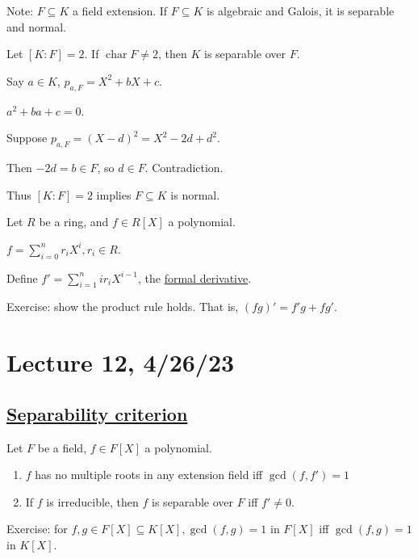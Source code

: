 \documentclass[x11names,reqno,14pt]{extarticle}
\DeclareMathOperator{\Char}{char}
\begin{document}
Note: $F\subseteq K$ a field extension. If $F \subseteq K$ is algebraic and Galois, it is separable and normal. 

\exm

Let $[K:F] = 2$. If $\Char F \neq 2$, then $K$ is separable over $F$. 

Say $a \in K$, $p_{a, F} = X^2 + bX + c$. 

$a^2 + ba + c = 0$. 

Suppose $p_{a, F} = (X - d)^2 = X^2 - 2d + d^2$. 

Then $-2d = b \in F$, so $d \in F$. Contradiction.

Thus $[K:F] = 2$ implies $F \subseteq K$ is normal. 


Let $R$ be a ring, and $f \in R[X]$ a polynomial. 

$f = \sum_{i=0}^nr_iX^i, r_i \in R$. 

Define $f' = \sum_{i=1}^nir_iX^{i - 1}$, the \underline{formal derivative}. 

Exercise: show the product rule holds. That is, $(fg)' = f'g + fg'$. 

\section*{Lecture 12, 4/26/23}

\subsection*{\underline{Separability criterion}}

\thm

Let $F$ be a field, $f \in F[X]$ a polynomial. 

\begin{enumerate}[label=(\alph*)]

\item $f$ has no multiple roots in any extension field iff $\gcd(f, f') = 1$ 

\item If $f$ is irreducible, then $f$ is separable over $F$ iff $f' \neq 0$. 

\end{enumerate}

Exercise: for $f, g \in F[X] \subseteq K[X], \gcd(f, g) = 1$ in $F[X]$ iff $\gcd(f, g) = 1$ in $K[X]$.

\proof\,
\end{document}
